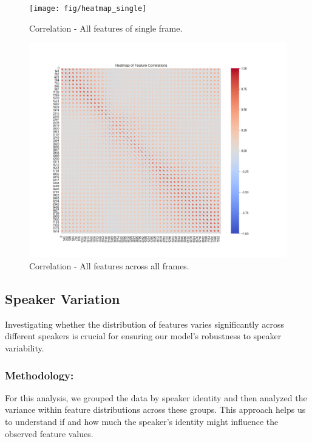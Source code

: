 \begin{figure}[!ht]
	\centering
	\begin{minipage}{0.49\textwidth}
		\centering
		\texttt{[image: fig/heatmap\_single]}
		\caption{Correlation - All features of single frame.}
		\label{fig:HeatmapSingle}
	\end{minipage}\hfill
	\begin{minipage}{0.49\textwidth}
		\centering
		\includegraphics[scale=0.3]{fig/heatmap_all}
		\caption{Correlation - All features across all frames.}
		\label{fig:HeatmapAll}
	\end{minipage}
\end{figure}

\subsection{Speaker Variation}

Investigating whether the distribution of features varies significantly across different speakers is crucial for ensuring our model's robustness to speaker variability.

\subsubsection{Methodology:}

For this analysis, we grouped the data by speaker identity and then analyzed the variance within feature distributions across these groups.
This approach helps us to understand if and how much the speaker's identity might influence the observed feature values.

